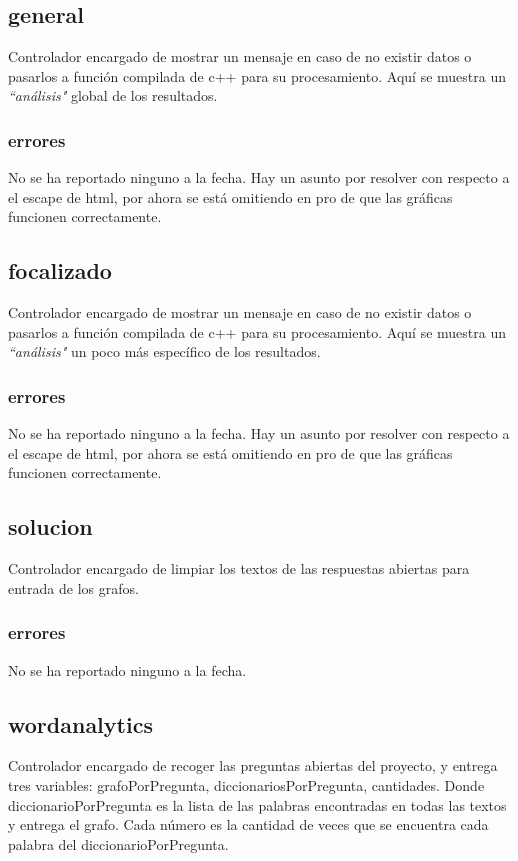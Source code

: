 \documentclass[10pt,a4paper]{book}
\begin{document}
	\subsection{general}
	Controlador encargado de mostrar un mensaje en caso de no existir datos o pasarlos a función compilada de c++ para su procesamiento. Aquí se muestra un \textit{``análisis"} global de los resultados.
	\subsubsection{errores}
	No se ha reportado ninguno a la fecha. Hay un asunto por resolver con respecto a el escape de html, por ahora se está omitiendo en pro de que las gráficas funcionen correctamente.

	\subsection{focalizado}
	Controlador encargado de mostrar un mensaje en caso de no existir datos o pasarlos a función compilada de c++ para su procesamiento. Aquí se muestra un \textit{``análisis"} un poco más específico de los resultados.
	\subsubsection{errores}
	No se ha reportado ninguno a la fecha. Hay un asunto por resolver con respecto a el escape de html, por ahora se está omitiendo en pro de que las gráficas funcionen correctamente.

	\subsection{solucion}
	Controlador encargado de limpiar los textos de las respuestas abiertas para entrada de los grafos.
	\subsubsection{errores}
	No se ha reportado ninguno a la fecha.

	\subsection{wordanalytics}
	Controlador encargado de recoger las preguntas abiertas del proyecto, y entrega tres variables: grafoPorPregunta, diccionariosPorPregunta, cantidades. Donde diccionarioPorPregunta es la lista de las palabras encontradas en todas las textos y entrega el grafo. Cada número es la cantidad de veces que se encuentra cada palabra del diccionarioPorPregunta.
\end{document}
